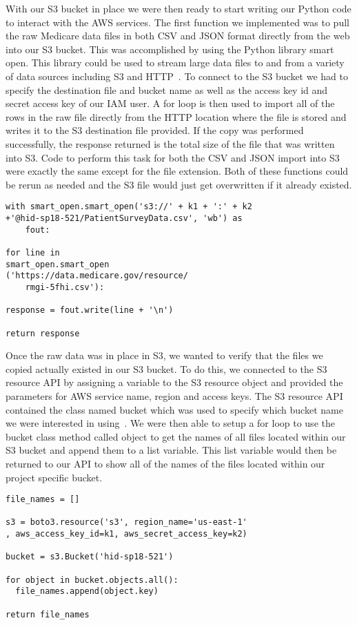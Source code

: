 With our S3 bucket in place we were then ready to start writing our Python 
code to interact with the AWS services. The first function we implemented was 
to pull the raw Medicare data files in both CSV and JSON format directly from 
the web into our S3 bucket. This was accomplished by using the Python library 
smart open. This library could be used to stream large data files to and from 
a variety of data sources including S3 and HTTP~\cite{hid-sp18-521-smartopen}. 
To connect to the S3 bucket we had to specify the destination file and bucket 
name as well as the access key id and secret access key of our IAM user. A for 
loop is then used to import all of the rows in the raw file directly from the 
HTTP location where the file is stored and writes it to the S3 destination 
file provided. If the copy was performed successfully, the response returned 
is the total size of the file that was written into S3. Code to perform this 
task for both the CSV and JSON import into S3 were exactly the same except for 
the file extension. Both of these functions could be rerun as needed and the 
S3 file would just get overwritten if it already existed. 

\begin{verbatim}
with smart_open.smart_open('s3://' + k1 + ':' + k2 
+'@hid-sp18-521/PatientSurveyData.csv', 'wb') as 
	fout:

for line in 
smart_open.smart_open
('https://data.medicare.gov/resource/
	rmgi-5fhi.csv'):
       
response = fout.write(line + '\n')

return response
\end{verbatim}

Once the raw data was in place in S3, we wanted to verify that the files we 
copied actually existed in our S3 bucket. To do this, we connected to the S3 
resource API by assigning a variable to the S3 resource object and provided 
the parameters for AWS service name, region and access keys. The S3 resource 
API contained the class named bucket which was used to specify which bucket 
name we were interested in using~\cite{hid-sp18-521-boto-bucket}. We were then 
able to setup a for loop to use the bucket class method called object to get 
the names of all files located within our S3 bucket and append them to a list 
variable. This list variable would then be returned to our API to show all of 
the names of the files located within our project specific bucket. 

\begin{verbatim}
file_names = []

s3 = boto3.resource('s3', region_name='us-east-1'
, aws_access_key_id=k1, aws_secret_access_key=k2)

bucket = s3.Bucket('hid-sp18-521')

for object in bucket.objects.all():
  file_names.append(object.key)

return file_names
\end{verbatim}

